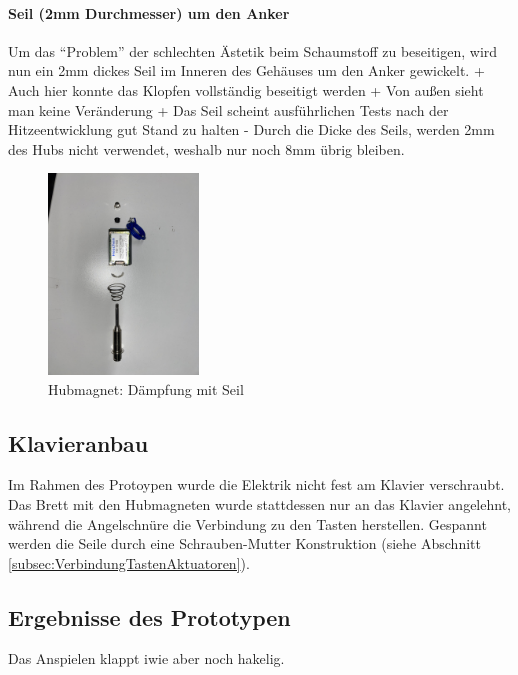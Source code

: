 \paragraph{Seil (2mm Durchmesser) um den Anker}

Um das \enquote{Problem} der schlechten Ästetik beim Schaumstoff zu beseitigen, wird nun ein 2mm dickes Seil im Inneren des Gehäuses um den Anker gewickelt. \newline
+ Auch hier konnte das Klopfen vollständig beseitigt werden \newline
+ Von außen sieht man keine Veränderung \newline
+ Das Seil scheint ausführlichen Tests nach der Hitzeentwicklung gut Stand zu halten  \newline
- Durch die Dicke des Seils, werden 2mm des Hubs nicht verwendet, weshalb nur noch 8mm übrig bleiben.

\begin{figure}[htbp]
    \centering
    \includegraphics [width=4cm] {img/Hubmagnet_Seil_Daempfung.jpg}
    \caption{Hubmagnet: Dämpfung mit Seil}
\end{figure}


\subsection{Klavieranbau}
Im Rahmen des Protoypen wurde die Elektrik nicht fest am Klavier verschraubt.
Das Brett mit den Hubmagneten wurde stattdessen nur an das Klavier angelehnt, während die Angelschnüre die Verbindung zu den Tasten herstellen.
Gespannt werden die Seile durch eine Schrauben-Mutter Konstruktion (siehe Abschnitt \ref{subsec:VerbindungTastenAktuatoren}).

\subsection{Ergebnisse des Prototypen}
Das Anspielen klappt iwie aber noch hakelig.


